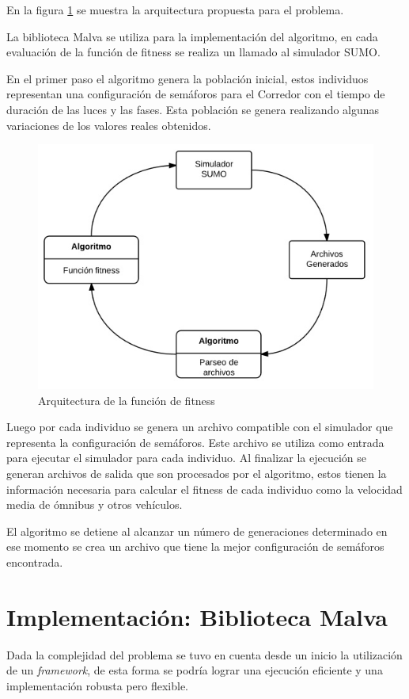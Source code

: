 En la figura \ref{fig:arquitectura1} se muestra la arquitectura propuesta para el problema.

La biblioteca Malva se utiliza para la implementación del algoritmo, en cada evaluación de la función de fitness se realiza un llamado al simulador SUMO. 

En el primer paso el algoritmo genera la población inicial, estos individuos representan una configuración de semáforos para el Corredor con el tiempo de duración de las luces y las fases. Esta población se genera realizando algunas variaciones de los valores reales obtenidos.

\begin{figure}[H]
	\centering
	\includegraphics[width=0.7\linewidth]{Figures/arquitectura1}
	\caption{Arquitectura de la función de fitness}
	\label{fig:arquitectura1}
\end{figure}

Luego por cada individuo se genera un archivo compatible con el simulador que representa la configuración de semáforos. Este archivo se utiliza como entrada para ejecutar el simulador para cada individuo. Al finalizar la ejecución se generan archivos de salida que son procesados por el algoritmo, estos tienen la información necesaria para calcular el fitness de cada individuo como la velocidad media de ómnibus y otros vehículos.

El algoritmo se detiene al alcanzar un número de generaciones determinado en ese momento se crea un archivo que tiene la mejor configuración de semáforos encontrada.




\section{Implementación: Biblioteca Malva}

Dada la complejidad del problema se tuvo en cuenta desde un inicio la utilización de un \emph{framework}, de esta forma se podría lograr una ejecución eficiente y una implementación robusta pero flexible. 

